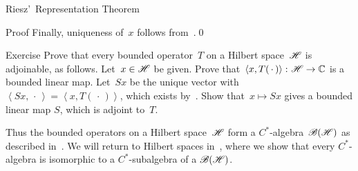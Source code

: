 \documentclass[a]{subfiles}
\begin{document}
\begin{parsec}
\begin{point}{Riesz'~Representation Theorem}
\begin{point}{Proof}
Finally, uniqueness of~$x$ follows from~.\qed
\end{point}
\end{point}
\begin{point}{Exercise}%
Prove that every bounded operator~$T$ on a Hilbert space~$\mathscr{H}$
is adjoinable, as follows.
Let~$x\in \mathscr{H}$ be given.
Prove that~$\left<x,T(\,\cdot\,)\right>\colon \mathscr{H}\to \mathbb{C}$
is a bounded linear map.
Let~$Sx$ be the unique vector with $\left<Sx,\,\cdot\,\right>
=\left<x,T(\,\cdot\,)\right>$,
which exists by~.
Show that~$x\mapsto Sx$
gives a bounded linear map $S$, which is adjoint to~$T$.
\end{point}
\begin{point}%
Thus the bounded operators
on a Hilbert space~$\mathscr{H}$
form a $C^*$-algebra~$\mathscr{B}(\mathscr{H})$%
as described in~.
We will return to Hilbert spaces
in~,
where we show that every $C^*$-algebra
is isomorphic to a $C^*$-subalgebra of
a $\mathscr{B}(\mathscr{H})$.
\end{point}
\end{parsec}
\end{document}
